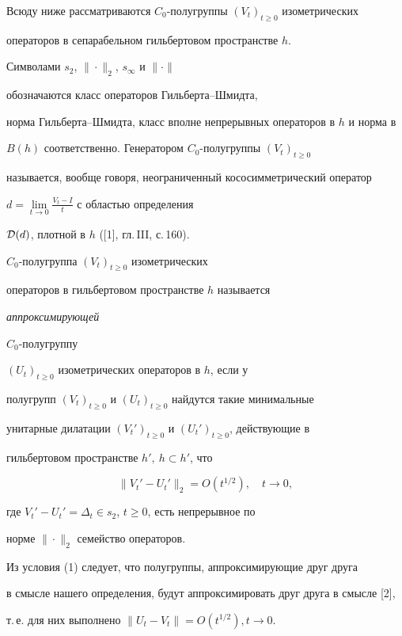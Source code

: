 Всюду ниже рассматриваются $C_0$-полугруппы $(V_t)_{t\geq 0}$ изометрических


операторов в сепарабельном гильбертовом пространстве $h$.


Символами $s_2$, $\|\cdot\|_2$, $s_{\infty}$ и $\|\cdot \|$


обозначаются класс операторов Гильберта--Шмидта,


норма Гильберта--Шмидта, класс вполне непрерывных операторов в $h$ и норма в


$B(h)$ соответственно. Генератором $C_0$-полугруппы $(V_t)_{t\geq 0}$


называется, вообще говоря, неограниченный кососимметрический оператор


$d=\lim \limits_{t\to 0}\frac {V_t-I}{t}$ с областью определения


${\cal D}(d)$, плотной в $h$ ([1], гл.\,III, с.\,160).





\begin{defnnonum}


$C_0$-полугруппа $(V_t)_{t\geq 0}$ изометрических


операторов в гильбертовом пространстве $h$ называется {\it аппроксимирующей


$C_0$-полугруппу} $(U_t)_{t\geq 0}$ изометрических операторов в $h$, если у


полугрупп $(V_t)_{t\geq 0}$ и $(U_t)_{t\geq 0}$ найдутся такие минимальные


унитарные дилатации $(V_t')_{t\geq 0}$ и $(U_t')_{t\geq 0}$, действующие в


гильбертовом пространстве $h',\ h\subset h'$, что


\begin{equation}


\|V_t'-U_t'\|_2=O(t^{1/2}),\quad t\to 0,


\end{equation}


где $V_t'-U_t'=\Delta_t\in s_2$, $t\geq 0$, есть непрерывное по


норме $\|\cdot \|_2$ семейство операторов.


\end{defnnonum}





\begin{note}


Из условия (1) следует, что полугруппы, аппроксимирующие друг друга


в смысле нашего определения, будут аппроксимировать друг друга в смысле [2],


т.\,е. для них выполнено $\|U_t-V_t\|=O(t^{1/2}),t\to 0$.


\end{note}





